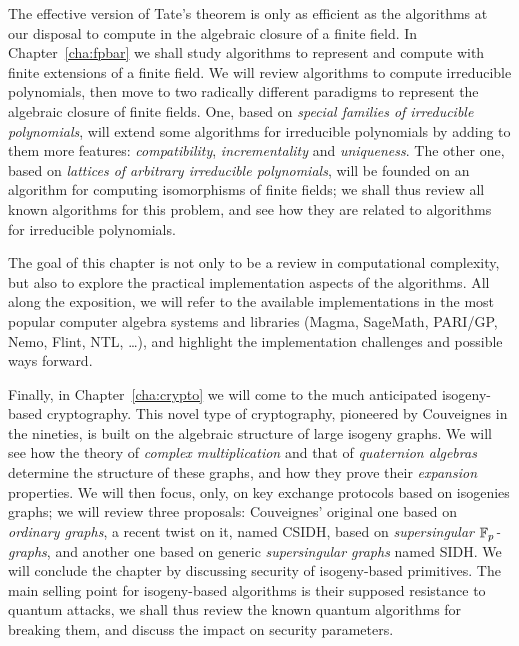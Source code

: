 \documentclass[b5layout]{hdr}
\begin{document}
The effective version of Tate's theorem is only as efficient as the
algorithms at our disposal to compute in the algebraic closure of a
finite field. %
In Chapter~\ref{cha:fpbar} we shall study algorithms to represent and
compute with finite extensions of a finite field. %
We will review algorithms to compute irreducible polynomials, then
move to two radically different paradigms to represent the algebraic
closure of finite fields. %
One, based on \emph{special families of irreducible polynomials}, will
extend some algorithms for irreducible polynomials by adding to them
more features: \emph{compatibility}, \emph{incrementality} and
\emph{uniqueness}. %
The other one, based on \emph{lattices of arbitrary irreducible
  polynomials}, will be founded on an algorithm for computing
isomorphisms of finite fields; we shall thus review all known
algorithms for this problem, and see how they are related to
algorithms for irreducible polynomials. %

The goal of this chapter is not only to be a review in computational
complexity, but also to explore the practical implementation aspects
of the algorithms. %
All along the exposition, we will refer to the available
implementations in the most popular computer algebra systems and
libraries (Magma, SageMath, PARI/GP, Nemo, Flint, NTL, \dots), and
highlight the implementation challenges and possible ways forward. %

Finally, in Chapter~\ref{cha:crypto} we will come to the much
anticipated isogeny-based cryptography. %
This novel type of cryptography, pioneered by Couveignes in the
nineties, is built on the algebraic structure of large isogeny
graphs. %
We will see how the theory of \emph{complex multiplication} and that
of \emph{quaternion algebras} determine the structure of these graphs,
and how they prove their \emph{expansion} properties. %
We will then focus, only, on key exchange protocols based on isogenies
graphs; we will review three proposals: Couveignes' original one based
on \emph{ordinary graphs}, a recent twist on it, named CSIDH, based on
\emph{supersingular $\mathbb{F}_p$-graphs}, and another one based on
generic \emph{supersingular graphs} named SIDH. %
We will conclude the chapter by discussing security of isogeny-based
primitives. %
The main selling point for isogeny-based algorithms is their supposed
resistance to quantum attacks, we shall thus review the known quantum
algorithms for breaking them, and discuss the impact on security
parameters. %
\end{document}
